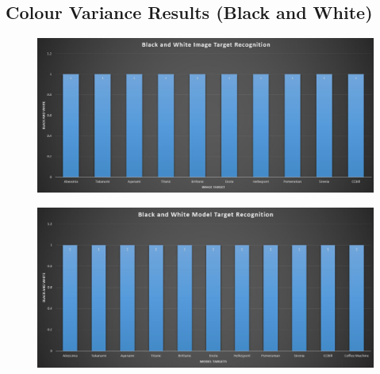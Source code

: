\documentclass{aifyp}
\begin{document}
\begin{appendices}
\section{Colour Variance Results (Black and White)}
\begin{figure}[H]
    \centering
    \includegraphics[scale=0.4]{Images/Chapter6/ImageTargetColourVariance.JPG}
    \label{fig:ImageTargetColourBarchart}
\end{figure}
\begin{figure}[H]
    \centering
    \includegraphics[scale=0.4]{Images/Chapter6/ModelTargetColourVariance.JPG}
    \label{fig:ModelTargetColourBarchart}
\end{figure}

\end{appendices}
\end{document}

